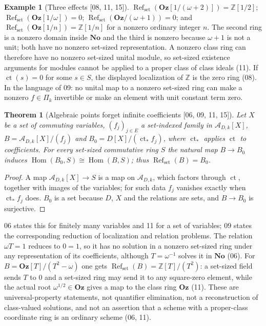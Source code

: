 \documentclass[11pt,letterpaper]{article}
\numberwithin{equation}{section}
\newtheorem{theorem}{Theorem}[section]
\theoremstyle{definition}
\newtheorem{example}[example]{Example}
\theoremstyle{remark}
\theoremstyle{plain}
\newcommand{\No}{\mathbf{No}}
\newcommand{\Oz}{\mathbf{Oz}}
\newcommand{\Z}{\mathbb Z}
\newcommand{\A}{\mathcal A}          %
\newcommand{\ct}{\operatorname{ct}}
\newcommand{\Hom}{\operatorname{Hom}}
\newcommand{\Refset}{\operatorname{Ref}_{\mathrm{set}}}
\newcommand{\src}[1]{\textup{\textsf{[#1]}}}
\begin{document}
\begin{example}[Three effects \src{08, 11, 15}]\label{osq:ex:localizations}
$\Refset(\Oz[1/(\omega+2)])=\Z[1/2]$; $\Refset(\Oz[1/\omega])=0$;
$\Refset(\Oz/(\omega+1))=0$; and $\Refset(\Oz[1/n])=\Z[1/n]$ for a nonzero ordinary
integer $n$. The second ring is a nonzero domain inside $\No$ and the third is nonzero because
$\omega+1$ is not a unit; both have no nonzero set-sized representation. A nonzero class ring
can therefore have no nonzero set-sized unital module, so set-sized existence arguments for
modules cannot be applied to a proper class of class ideals (11). If $\ct(s)=0$ for some
$s\in S$, the displayed localization of $\Z$ is the zero ring (08). In the language of 09: no
unital map to a nonzero set-sized ring can make a nonzero $f\in\Pi_k$ invertible or make an
element with unit constant term zero.
\end{example}

\begin{theorem}[Algebraic points forget infinite coefficients \src{06, 09, 11, 15}]\label{osq:thm:presentations}
Let $X$ be a set of commuting variables, $(f_j)_{j\in E}$ a set-indexed family in
$\A_{D,k}[X]$, $B=\A_{D,k}[X]/(f_j)$ and $B_0=D[X]/(\ct_*f_j)$, where $\ct_*$ applies
$\ct$ to coefficients. For every set-sized commutative ring $S$ the natural map $B\to B_0$
induces $\Hom(B_0,S)\cong\Hom(B,S)$; thus $\Refset(B)=B_0$.
\end{theorem}
\begin{proof}
A map $\A_{D,k}[X]\to S$ is a map on $\A_{D,k}$, which factors through $\ct$, together with
images of the variables; for such data $f_j$ vanishes exactly when $\ct_*f_j$ does. $B_0$ is a
set because $D$, $X$ and the relations are sets, and $B\to B_0$ is surjective.
\end{proof}

06 states this for finitely many variables and 11 for a set of variables; 09 states the
corresponding reduction of localization and relation problems. The relation $\omega T=1$
reduces to $0=1$, so it has no solution in a nonzero set-sized ring under any representation
of its coefficients, although $T=\omega^{-1}$ solves it in $\No$ (06). For
$B=\Oz[T]/(T^2-\omega)$ one gets $\Refset(B)=\Z[T]/(T^2)$: a set-sized field sends $T$ to
$0$ and a set-sized ring may send it to any square-zero element, while the actual root
$\omega^{1/2}\in\Oz$ gives a map to the class ring $\Oz$ (11). These are universal-property
statements, not quantifier elimination, not a reconstruction of class-valued solutions, and
not an assertion that a scheme with a proper-class coordinate ring is an ordinary scheme
(06, 11).
\end{document}
